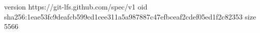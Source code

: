 version https://git-lfs.github.com/spec/v1
oid sha256:1eae53fc9deafcb599cd1cee311a5a987887c47efbceaf2cdef05ed1f2c82353
size 5566
